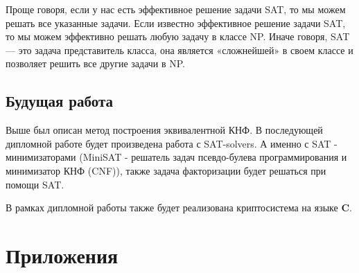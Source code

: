 \documentclass[12pt]{article}
\begin{document}
Проще говоря, если у нас есть эффективное решение задачи SAT, то мы можем решать все указанные задачи. Если известно эффективное решение задачи SAT, то мы можем эффективно решать любую задачу в классе NP. Иначе говоря, SAT — это задача представитель класса, она является «сложнейшей» в своем классе и позволяет решить все другие задачи в NP.

\subsection{Будущая работа}

Выше был описан метод построения эквивалентной КНФ. В последующей дипломной работе будет произведена работа с SAT-solvers. А именно с SAT - минимизаторами  (MiniSAT - решатель задач псевдо-булева программирования и минимизатор КНФ (CNF)), также задача факторизации будет решаться при помощи SAT.

В рамках дипломной работы также будет реализована криптосистема на языке \textbf{C}. 


\newpage

\section{Приложения}
\end{document}
